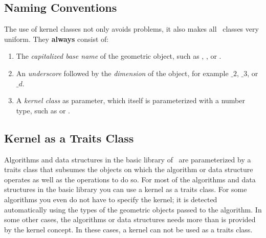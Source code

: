 \subsection{Naming Conventions}

The use of kernel classes not only avoids problems, it also makes all
\cgal\ classes very uniform. They {\bf always} consist of:
\begin{enumerate}
\begin{ccTexOnly}
\itemsep0pt\parskip0pt
\end{ccTexOnly}

\item The {\em capitalized base name} of the geometric object, such as 
      , , or .

\item An {\em underscore} followed by the {\em dimension} of the object, 
      for example $\_2$, $\_3$, or $\_d$.
      
    \item A {\em kernel class} as parameter, which itself is
      parameterized with a number type, such as
       or
      .
\end{enumerate}

\subsection{Kernel as a Traits Class}
Algorithms and data structures in the basic library of \cgal\ are
parameterized by a traits class that subsumes the objects on which the
algorithm or data structure operates as well as the operations to do
so. For most of the algorithms and data structures in the basic
library you can use a kernel as a traits class. For some algorithms
you even do not have to specify the kernel; it is detected
automatically using the types of the geometric objects passed to the
algorithm. In some other cases, the algorithms or data structures
needs more than is provided by the kernel concept. In these cases, a
kernel can not be used as a traits class.


